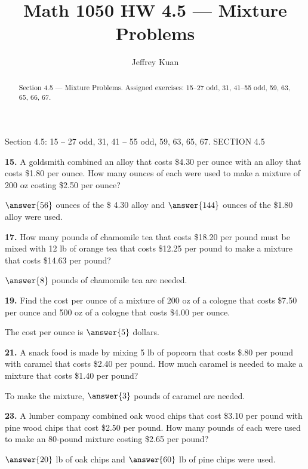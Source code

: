 \documentclass{ximera}
\author{Jeffrey Kuan}
\title{Math 1050 HW 4.5 --- Mixture Problems}
\begin{document}
\begin{abstract}
    Section 4.5 --- Mixture Problems.
    Assigned exercises: 15–27 odd, 31, 41–55 odd, 59, 63, 65, 66, 67.
\end{abstract}

\maketitle

Section 4.5: 15 – 27 odd, 31, 41 – 55 odd, 59, 63, 65, 67. SECTION 4.5

\begin{problem}
\textbf{15.} A goldsmith combined an alloy that costs \$4.30 per ounce with an alloy that costs
  \$1.80 per ounce. How many ounces of each were used to make a mixture of 200 oz costing
  \$2.50 per ounce?

\( \answer{56} \)  ounces of the  \$ 4.30 alloy and \( \answer{144} \) ounces of the \$1.80 alloy were used.
\end{problem}

\begin{problem}
\textbf{17.} How many pounds of chamomile tea that costs \$18.20 per pound must be mixed with
  12 lb of orange tea that costs \$12.25 per pound to make a mixture that costs \$14.63
  per pound?

\( \answer{8} \) pounds of chamomile tea are needed.
\end{problem}

\begin{problem}
\textbf{19.} Find the cost per ounce of a mixture of 200 oz of a cologne that costs \$7.50 per
  ounce and 500 oz of a cologne that costs \$4.00 per ounce.

The cost per ounce is \( \answer{5} \) dollars.
\end{problem}

\begin{problem}
\textbf{21.} A snack food is made by mixing 5 lb of popcorn that costs \$.80 per pound with
  caramel that costs \$2.40 per pound. How much caramel is needed to make a mixture that
  costs \$1.40 per pound?

To make the mixture, \( \answer{3} \) pounds of caramel are needed.
\end{problem}

\begin{problem}
\textbf{23.} A lumber company combined oak wood chips that cost \$3.10 per pound with pine wood
  chips that cost \$2.50 per pound. How many pounds of each were used to make an
  80-pound mixture costing \$2.65 per pound?

\( \answer{20} \) lb of oak chips and \( \answer{60} \) lb of pine chips were used.
\end{problem}
\end{document}
